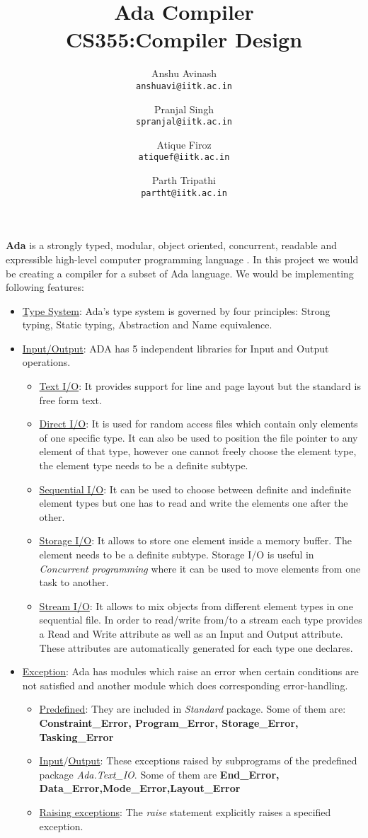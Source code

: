 \documentclass{article}
\title{
Ada Compiler \\
CS355:Compiler Design
}
\author{
Anshu Avinash\\
\texttt{anshuavi@iitk.ac.in}
\and
Pranjal Singh\\
\texttt{spranjal@iitk.ac.in}
\and
Atique Firoz\\
\texttt{atiquef@iitk.ac.in}
\and
Parth Tripathi\\
\texttt{partht@iitk.ac.in}
}
\begin{document}
\maketitle
\textbf{Ada} is a strongly typed, modular, object oriented, concurrent, readable and expressible high-level computer programming language \cite{AdaIC}. In this project we would be creating a compiler for a subset of Ada language. We would be implementing following features:
\begin{itemize}
	\item \uline{Type System}: Ada's type system is governed by four principles: Strong typing, Static typing, Abstraction and Name equivalence.
	\item \uline{Input/Output}: ADA has 5 independent libraries for Input and Output operations.
	\begin{itemize}
		\item \uline{Text I/O}: It provides support for line and page layout but the standard is free form text.
		\item \uline{Direct I/O}: It is used for random access files which contain only elements of one specific type. It can also be used to position the file pointer to any element of that type, however one cannot freely choose the element type, the element type needs to be a definite subtype.
		\item \uline{Sequential I/O}: It can be used to choose between definite and indefinite element types but one has to read and write the elements one after the other.
		\item \uline{Storage I/O}: It allows to store one element inside a memory buffer. The element needs to be a
definite subtype. Storage I/O is useful in \emph{Concurrent programming} where it can be used to move elements from one task to another.
		\item \uline{Stream I/O}: It allows to mix objects from different element types in one sequential file. In order to read/write from/to a stream each type provides a Read and Write attribute as well as an Input and Output attribute. These attributes are automatically generated for each type one declares.

	\end{itemize}
	\item \uline{Exception}: Ada has modules which raise an error when certain conditions are not satisfied and another module which does corresponding error-handling.
	\begin{itemize}
		\item \uline{Predefined}: They are included in \emph{Standard} package. Some of them are: \textbf{Constraint\_Error, Program\_Error, Storage\_Error, Tasking\_Error}
		\item \uline{Input$/$Output}: These exceptions raised by subprograms of the predefined package \emph{Ada.Text\_IO}. Some of them are \textbf{End\_Error, Data\_Error,Mode\_Error,Layout\_Error}
		\item \uline{Raising exceptions}: The \emph{raise} statement explicitly raises a specified exception.
	\end{itemize}
\end{itemize}
\printbibliography
\end{document}
